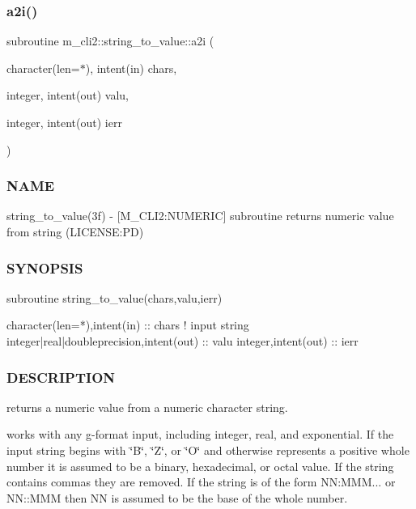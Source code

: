\mbox{\label{interfacem__cli2_1_1string__to__value_af221de32e1c7dd6915ea45dc3a0147ed}} 
\subsubsection{\texorpdfstring{a2i()}{a2i()}}
{\footnotesize\ttfamily subroutine m\+\_\+cli2\+::string\+\_\+to\+\_\+value\+::a2i (\begin{DoxyParamCaption}\item[{character(len=$\ast$), intent(in)}]{chars,  }\item[{integer, intent(out)}]{valu,  }\item[{integer, intent(out)}]{ierr }\end{DoxyParamCaption})\hspace{0.3cm}{\ttfamily [private]}}



\subsubsection*{N\+A\+ME}

string\+\_\+to\+\_\+value(3f) -\/ \mbox{[}M\+\_\+\+C\+L\+I2\+:N\+U\+M\+E\+R\+IC\mbox{]} subroutine returns numeric value from string (L\+I\+C\+E\+N\+SE\+:PD) 

\subsubsection*{S\+Y\+N\+O\+P\+S\+IS}

\begin{DoxyVerb}subroutine string_to_value(chars,valu,ierr)

 character(len=*),intent(in)              :: chars   ! input string
 integer|real|doubleprecision,intent(out) :: valu
 integer,intent(out)                      :: ierr
\end{DoxyVerb}
 \subsubsection*{D\+E\+S\+C\+R\+I\+P\+T\+I\+ON}

returns a numeric value from a numeric character string.

works with any g-\/format input, including integer, real, and exponential. If the input string begins with \char`\"{}\+B\char`\"{}, \char`\"{}\+Z\char`\"{}, or \char`\"{}\+O\char`\"{} and otherwise represents a positive whole number it is assumed to be a binary, hexadecimal, or octal value. If the string contains commas they are removed. If the string is of the form NN\+:M\+MM... or N\+N\+::\+M\+MM then NN is assumed to be the base of the whole number.

